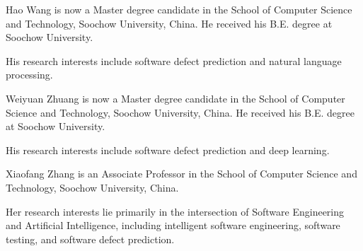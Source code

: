 \documentclass[journal]{IEEEtran}
\begin{document}
\begin{IEEEbiography}{Hao Wang}
is now a Master degree candidate in the School of Computer Science and Technology, Soochow University, China. He received his B.E. degree at Soochow University. 

His research interests include software defect prediction and natural language processing.
\end{IEEEbiography}


\begin{IEEEbiography}{Weiyuan Zhuang}
is now a Master degree candidate in the School of Computer Science and Technology, Soochow University, China. He received his B.E. degree at Soochow University. 

His research interests include software defect prediction and deep learning.
\end{IEEEbiography}


\begin{IEEEbiography}{Xiaofang Zhang}
is an Associate Professor in the School of Computer Science and Technology, Soochow University, China. 

Her research interests lie primarily in the intersection of Software Engineering and Artificial Intelligence, including intelligent software engineering, software testing, and software defect prediction.
\end{IEEEbiography}
\end{document}
